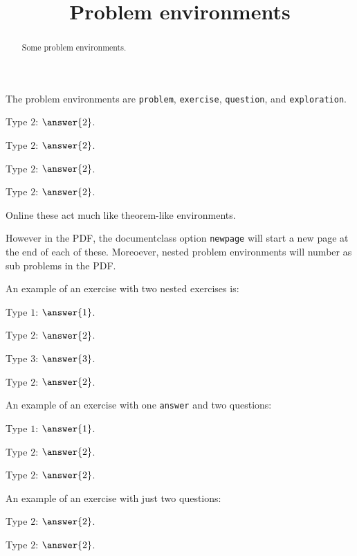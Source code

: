 \documentclass{ximera}
\title{Problem environments}
\begin{document}
\begin{abstract}
  Some problem environments.
\end{abstract}
\maketitle

The problem environments are \verb|problem|, \verb|exercise|, \verb|question|, and \verb|exploration|.


\begin{exercise}
  Type $2$: $\answer{2}$.
\end{exercise}

\begin{problem}
  Type $2$: $\answer{2}$.
\end{problem}

\begin{question}
  Type $2$: $\answer{2}$.
\end{question}

\begin{exploration}
  Type $2$: $\answer{2}$.
\end{exploration}

Online these act much like theorem-like environments.

However in the PDF, the documentclass option \verb|newpage| will start
a new page at the end of each of these. Moreoever, nested problem
environments will number as sub problems in the PDF.

An example of an exercise with two nested exercises is:
\begin{exercise}
  Type $1$: $\answer{1}$.
  \begin{exercise}
    Type $2$: $\answer{2}$.
    \begin{exercise}
      Type $3$: $\answer{3}$.
    \end{exercise}
  \end{exercise}
  \begin{exercise}
    Type $2$: $\answer{2}$.
  \end{exercise}
\end{exercise}


An example of an exercise with one \verb|answer| and two questions:

\begin{exercise}
  Type $1$: $\answer{1}$.
  \begin{question}
    Type $2$: $\answer{2}$.
  \end{question}
  \begin{question}
    Type $2$: $\answer{2}$.
  \end{question}
\end{exercise}

An example of an exercise with just two questions:

\begin{exercise}
  \begin{question}
    Type $2$: $\answer{2}$.
  \end{question}
  \begin{question}
    Type $2$: $\answer{2}$.
  \end{question}
\end{exercise}
\end{document}
